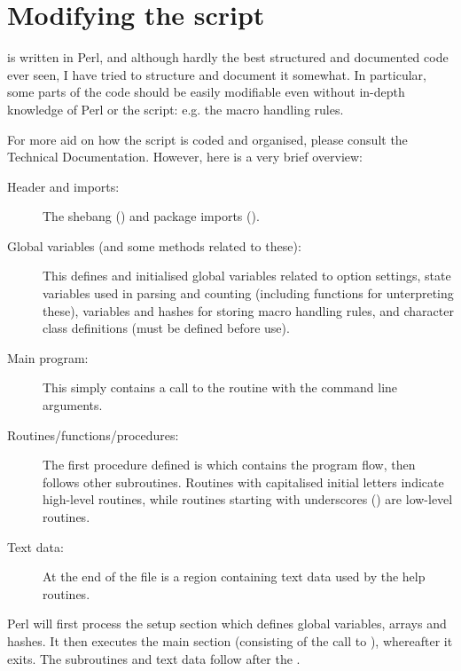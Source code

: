 \documentclass{article}
\begin{document}
\section{Modifying the \TeXcount{} script}\label{sec:code}

\TeXcount{} is written in Perl, and although hardly the best structured and documented code ever seen, I have tried to structure and document it somewhat. In particular, some parts of the code should be easily modifiable even without in-depth knowledge of Perl or the \TeXcount{} script: e.g. the macro handling rules.

For more aid on how the \TeXcount{} script is coded and organised, please consult the Technical Documentation. However, here is a very brief overview:

\begin{description}

\item[Header and imports:] The shebang (\code{\#!}) and package imports ().

\item[Global variables (and some methods related to these):] This defines and initialised global variables related to option settings, state variables used in parsing and counting (including functions for unterpreting these), variables and hashes for storing macro handling rules, and character class definitions (must be defined before use).

\item[Main program:] This simply contains a call to the  routine with the command line arguments.

\item[Routines/functions/procedures:] The first procedure defined is  which contains the program flow, then follows other subroutines. Routines with capitalised initial letters indicate high-level routines, while routines starting with underscores (\code{_}) are low-level routines.

\item[Text data:] At the end of the file is a  region containing text data used by the help routines.

\end{description}

Perl will first process the setup section which defines global variables, arrays and hashes. It then executes the main section (consisting of the call to ), whereafter it exits. The subroutines and text data follow after the .
\end{document}
